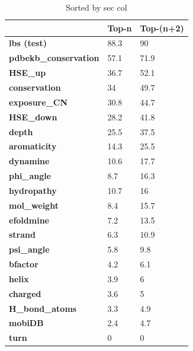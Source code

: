\begin{table}[]
\centering
\begin{tabular}{lll}
\hline
                              & Top-n & Top-(n+2) \\ \hline
\textbf{lbs (test)}                  & 88.3  & 90        \\
\textbf{pdbekb\_conservation} & 57.1  & 71.9      \\
\textbf{HSE\_up}              & 36.7  & 52.1      \\
\textbf{conservation}         & 34    & 49.7      \\
\textbf{exposure\_CN}         & 30.8  & 44.7      \\
\textbf{HSE\_down}            & 28.2  & 41.8      \\
\textbf{depth}                & 25.5  & 37.5      \\
\textbf{aromaticity}          & 14.3  & 25.5      \\
\textbf{dynamine}             & 10.6  & 17.7      \\
\textbf{phi\_angle}           & 8.7   & 16.3      \\
\textbf{hydropathy}           & 10.7  & 16        \\
\textbf{mol\_weight}          & 8.4   & 15.7      \\
\textbf{efoldmine}            & 7.2   & 13.5      \\
\textbf{strand}               & 6.3   & 10.9      \\
\textbf{psi\_angle}           & 5.8   & 9.8       \\
\textbf{bfactor}              & 4.2   & 6.1       \\
\textbf{helix}                & 3.9   & 6         \\
\textbf{charged}              & 3.6   & 5         \\
\textbf{H\_bond\_atoms}       & 3.3   & 4.9       \\
\textbf{mobiDB}               & 2.4   & 4.7       \\
\textbf{turn}                 & 0     & 0         \\ \hline
\end{tabular}
\caption{Sorted by sec col}
\label{tab:p2rankCSVOne}
\end{table}

